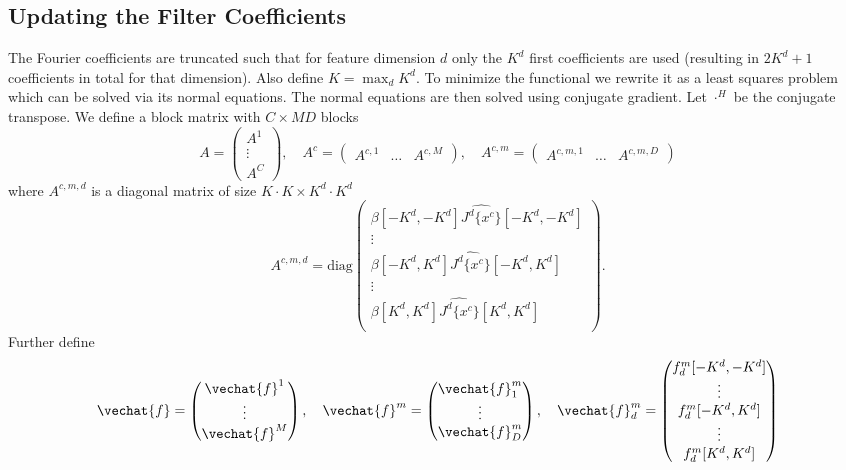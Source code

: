 \documentclass[runningheads,a4paper]{llncs}
\begin{document}
\subsection{Updating the Filter Coefficients}
The Fourier coefficients are truncated such that for feature dimension $d$ only the $K^d$ first coefficients are used (resulting in $2K^d+1$ coefficients in total for that dimension). Also define $K = \max_d K^d$. To minimize the functional we rewrite it as a least squares problem which can be solved via its normal equations. The normal equations are then solved using conjugate gradient. Let $\cdot^H$ be the conjugate transpose. We define a block matrix with $C\times MD$ blocks
\begin{equation}
  A = \begin{pmatrix}
    A^1\\
    \vdots\\
    A^C
    \end{pmatrix},\quad
  A^c = \begin{pmatrix}A^{c,1} & \dots & A^{c,M}\end{pmatrix},\quad
  A^{c,m} = \begin{pmatrix}A^{c,m,1} & \dots & A^{c,m,D}\end{pmatrix}
\end{equation}
where $A^{c,m,d}$ is a diagonal matrix of size $K\cdot K\times K^d\cdot K^d$\begin{equation}
  A^{c,m,d} = \text{diag}\begin{pmatrix}
    \beta[-K^d,-K^d]\widehat{J^d\{x^c\}}[-K^d,-K^d]\\
    \vdots\\
    \beta[-K^d,K^d]\widehat{J^d\{x^c\}}[-K^d,K^d]\\
    \vdots\\
    \beta[K^d,K^d]\widehat{J^d\{x^c\}}[K^d,K^d]\\
  \end{pmatrix}.
\end{equation}
Further define
\begin{equation}
  \vechat{f} = \begin{pmatrix}
    \vechat{f}^1\\
    \vdots\\
    \vechat{f}^M
  \end{pmatrix},\quad
  \vechat{f}^m = \begin{pmatrix}
    \vechat{f}_1^{m}\\
    \vdots\\
    \vechat{f}_D^{m}
  \end{pmatrix},\quad
  \vechat{f}_d^{m} = \begin{pmatrix}
    f_d^{m}[-K^d,-K^d]\\
    \vdots\\
    f_d^{m}[-K^d,K^d]\\
    \vdots\\
    f_d^{m}[K^d,K^d]
  \end{pmatrix}
\end{equation}
\end{document}
